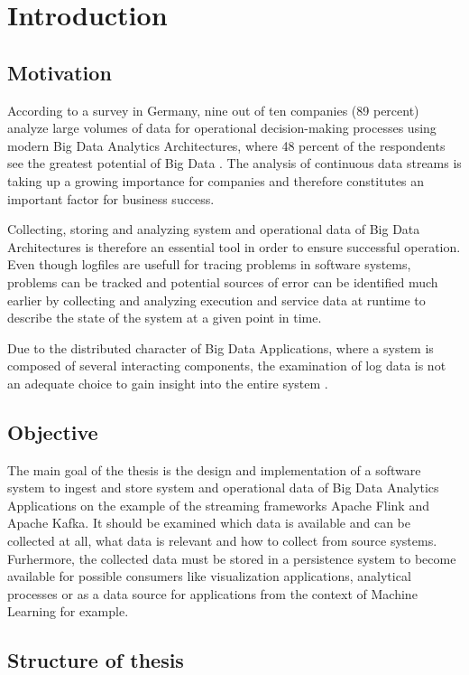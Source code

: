 \chapter{Introduction}
\section{Motivation}
According to a survey in Germany, nine out of ten companies (89 percent) analyze large
volumes of data for operational decision-making processes using modern Big Data Analytics
Architectures, where 48 percent of the respondents see the greatest potential of Big Data
\cite{Bitk14}. The analysis of continuous data streams is taking up a growing importance
for companies and therefore constitutes an important factor for business success.

Collecting, storing and analyzing system and operational data of Big Data Architectures is
therefore an essential tool in order to ensure successful operation. Even though logfiles are
usefull for tracing problems in software systems, problems can be tracked and potential sources
of error can be identified much earlier by collecting and analyzing execution and service data at
runtime to describe the state of the system at a given point in time.

Due to the distributed character of Big Data Applications, where a system is composed of several
interacting components, the examination of log data is not an adequate choice to gain insight
into the entire system \cite{VanL14}.

\section{Objective}

The main goal of the thesis is the design and implementation of a software system to ingest
and  store system and operational data of Big Data Analytics Applications on the example of
the streaming frameworks Apache Flink and Apache Kafka. It should be examined which data is
available and can be collected at all, what data is relevant and how to collect from source
systems. Furhermore, the collected data must be stored in a persistence system to become
available for possible consumers like visualization applications, analytical processes or as
a data source for applications from the context of Machine Learning for example.

\section{Structure of thesis}

